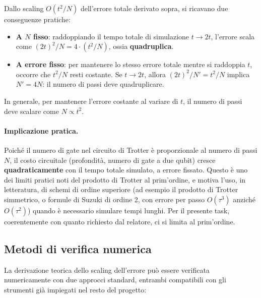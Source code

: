 \documentclass[11pt,a4paper]{article}
\begin{document}
Dallo scaling $O(t^2/N)$ dell'errore totale derivato sopra, si ricavano due conseguenze pratiche:

\begin{itemize}
\item \textbf{A $N$ fisso}: raddoppiando il tempo totale di simulazione $t\to 2t$, l'errore scala come $(2t)^2/N = 4\cdot(t^2/N)$, ossia \textbf{quadruplica}.
\item \textbf{A errore fisso}: per mantenere lo stesso errore totale mentre si raddoppia $t$, occorre che $t^2/N$ resti costante. Se $t\to2t$, allora $(2t)^2/N' = t^2/N$ implica $N' = 4N$: il numero di passi deve quadruplicare.
\end{itemize}

In generale, per mantenere l'errore costante al variare di $t$, il numero di passi deve scalare come $N\propto t^2$.

\paragraph{Implicazione pratica.} Poiché il numero di gate nel circuito di Trotter è proporzionale al numero di passi $N$, il costo circuitale (profondità, numero di gate a due qubit) cresce \textbf{quadraticamente} con il tempo totale simulato, a errore fissato. Questo è uno dei limiti pratici noti del prodotto di Trotter al prim'ordine, e motiva l'uso, in letteratura, di schemi di ordine superiore (ad esempio il prodotto di Trotter simmetrico, o formule di Suzuki di ordine 2, con errore per passo $O(\tau^3)$ anziché $O(\tau^2)$) quando è necessario simulare tempi lunghi. Per il presente task, coerentemente con quanto richiesto dal relatore, ci si limita al prim'ordine.

\subsection{Metodi di verifica numerica}

La derivazione teorica dello scaling dell'errore può essere verificata numericamente con due approcci standard, entrambi compatibili con gli strumenti già impiegati nel resto del progetto:
\end{document}
